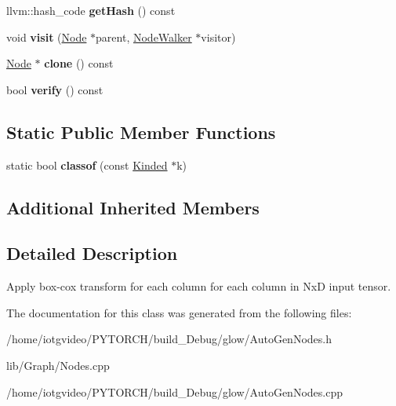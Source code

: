 \begin{DoxyCompactItemize}
\mbox{\label{classglow_1_1_batch_box_cox_node_aa8fd207db0d5875b36abae140df702d9}} 
llvm\+::hash\+\_\+code {\bfseries get\+Hash} () const
\item 
\mbox{\label{classglow_1_1_batch_box_cox_node_a66832cf19c7626d2d71da478389bf2a8}} 
void {\bfseries visit} (\hyperlink{classglow_1_1_node}{Node} $\ast$parent, \hyperlink{classglow_1_1_node_walker}{Node\+Walker} $\ast$visitor)
\item 
\mbox{\label{classglow_1_1_batch_box_cox_node_a404578c8ba2ef32b3c64455d5687c420}} 
\hyperlink{classglow_1_1_node}{Node} $\ast$ {\bfseries clone} () const
\item 
\mbox{\label{classglow_1_1_batch_box_cox_node_a135cc7b4ebf95edb2d109a5a74927649}} 
bool {\bfseries verify} () const
\end{DoxyCompactItemize}
\subsection*{Static Public Member Functions}
\begin{DoxyCompactItemize}
\item 
\mbox{\label{classglow_1_1_batch_box_cox_node_a7279a934eeda309fa9da2193de369178}} 
static bool {\bfseries classof} (const \hyperlink{classglow_1_1_kinded}{Kinded} $\ast$k)
\end{DoxyCompactItemize}
\subsection*{Additional Inherited Members}


\subsection{Detailed Description}
Apply box-\/cox transform for each column for each column in NxD input tensor. 

The documentation for this class was generated from the following files\+:\begin{DoxyCompactItemize}
\item 
/home/iotgvideo/\+P\+Y\+T\+O\+R\+C\+H/build\+\_\+\+Debug/glow/Auto\+Gen\+Nodes.\+h\item 
lib/\+Graph/Nodes.\+cpp\item 
/home/iotgvideo/\+P\+Y\+T\+O\+R\+C\+H/build\+\_\+\+Debug/glow/Auto\+Gen\+Nodes.\+cpp\end{DoxyCompactItemize}
